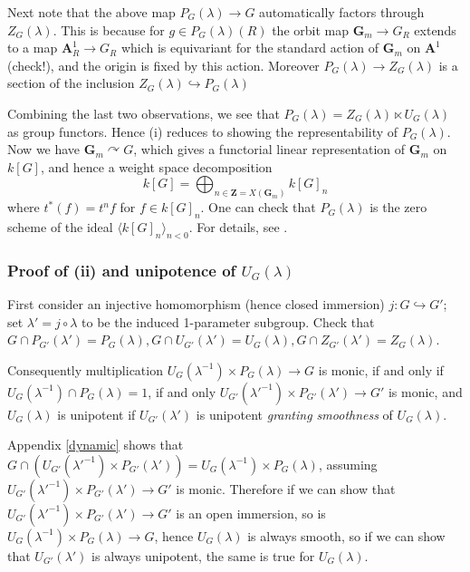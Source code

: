 \documentclass[10pt]{article}
\renewcommand{\(}{\left(}
\renewcommand{\)}{\right)}
\newcommand{\actson}{\curvearrowright}
\numberwithin{thm}{subsection}
\begin{document}
Next note that the above map $P_G(\lambda) \rightarrow G$
automatically factors through $Z_G(\lambda)$.
This is because for $g\in P_G(\lambda)(R)$
the orbit map $\mathbf{G}_m\rightarrow G_R$ extends to 
a map $\mathbf{A}^1_R\rightarrow G_R$ which is equivariant for the
standard action of $\mathbf{G}_m$ on $\mathbf{A}^1$ (check!),
and the origin is fixed by this action.
Moreover $P_G(\lambda)\rightarrow Z_G(\lambda)$ is a section of
the inclusion $Z_G(\lambda)\hookrightarrow P_G(\lambda)$

Combining the last two observations, we see that $P_G(\lambda)=Z_G(\lambda)\ltimes U_G(\lambda)$ as group functors.
Hence (i) reduces to showing the representability
of $P_G(\lambda)$.
Now we have $\mathbf{G}_m\actson  G$,
which gives a functorial linear representation
of $\mathbf{G}_m$ on $k[G]$,
and hence a weight space decomposition
\[k[G]=\bigoplus_{n\in \mathbf{Z}= X(\mathbf{G}_m)} k[G]_n\]
where $t^*(f)=t^nf$
for $f\in k[G]_n$.
One can check that $P_G(\lambda)$ is the zero scheme of the ideal
$\langle k[G]_n\rangle_{n<0}$.
For details, see \cite[Lemma 2.1.4]{pred}. 

\subsubsection{Proof of (ii) and unipotence of $U_G(\lambda)$}
First consider an injective homomorphism (hence closed immersion)
$j:G\hookrightarrow G'$;
set $\lambda'=j\circ \lambda$ to be the induced 1-parameter subgroup.
Check that $G\cap P_{G'}(\lambda')=P_G(\lambda),
G\cap U_{G'}(\lambda')=U_G(\lambda),
G\cap Z_{G'}(\lambda')=Z_G(\lambda)$.

Consequently multiplication $U_G(\lambda^{-1})\times P_G(\lambda)\rightarrow G$
is monic,
if and only if $U_G(\lambda^{-1})\cap P_G(\lambda)=1$,
if and only $U_{G'}(\lambda'^{-1})\times P_{G'}(\lambda')\rightarrow G'$ is monic,
and $U_G(\lambda)$ is unipotent
if $U_{G'}(\lambda')$ is unipotent \textit{granting smoothness}
of $U_G(\lambda)$.

Appendix \ref{dynamic} shows that $G\cap (U_{G'}(\lambda'^{-1})\times P_{G'}(\lambda'))=
U_G(\lambda^{-1})\times P_G(\lambda)$,
assuming $U_{G'}(\lambda'^{-1})\times P_{G'}(\lambda')
\rightarrow G'$ is monic.
Therefore if we can show that 
$U_{G'}(\lambda'^{-1})\times P_{G'}(\lambda')\rightarrow G'$
is an open immersion, so
is $U_G(\lambda^{-1})\times P_G(\lambda)\rightarrow G$,
hence $U_G(\lambda)$ is always smooth,
so if we can show that $U_{G'}(\lambda')$ is always unipotent,
the same is true for $U_G(\lambda)$.
\end{document}
